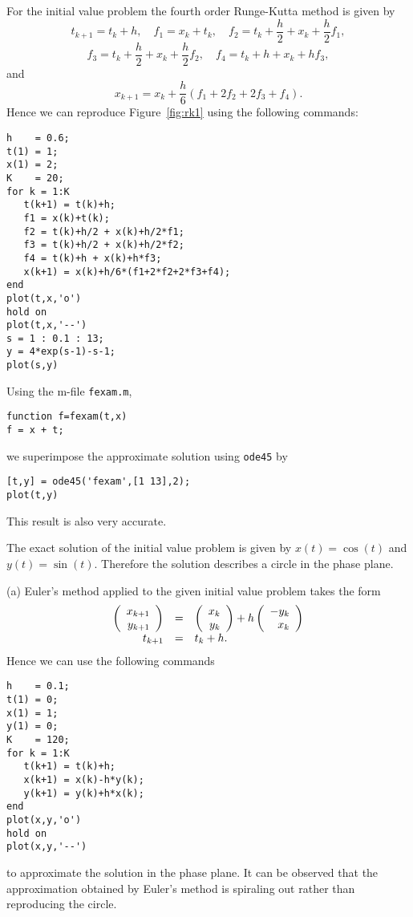  For the initial value problem  the
fourth order Runge-Kutta method is given by
\[
t_{k+1} = t_k+h,\quad f_1= x_k + t_k,\quad
f_2 = t_k+\frac{h}{2} + x_k + \frac{h}{2}f_1,
\]
\[
f_3 = t_k+\frac{h}{2} + x_k + \frac{h}{2}f_2,\quad f_4 = t_k+h+x_k+hf_3,
\]
and
\[
x_{k+1} = x_k + \frac{h}{6}(f_1+2f_2+2f_3+f_4).
\]
Hence we can reproduce Figure~\ref{fig:rk1} using the following
\Matlab commands:
\begin{verbatim}
h    = 0.6;
t(1) = 1;
x(1) = 2;
K    = 20;
for k = 1:K
   t(k+1) = t(k)+h;
   f1 = x(k)+t(k);
   f2 = t(k)+h/2 + x(k)+h/2*f1;
   f3 = t(k)+h/2 + x(k)+h/2*f2;
   f4 = t(k)+h + x(k)+h*f3;
   x(k+1) = x(k)+h/6*(f1+2*f2+2*f3+f4);
end
plot(t,x,'o')
hold on
plot(t,x,'--')
s = 1 : 0.1 : 13;
y = 4*exp(s-1)-s-1;
plot(s,y)
\end{verbatim}
Using the m-file {\tt fexam.m},
\begin{verbatim}
function f=fexam(t,x)
f = x + t;
\end{verbatim}
we superimpose the approximate solution using {\tt ode45} by
\begin{verbatim}
[t,y] = ode45('fexam',[1 13],2);
plot(t,y)
\end{verbatim}
This result is also very accurate.

 The exact solution of the initial value problem
is given by $x(t) = \cos(t)$ and $y(t)=\sin(t)$.  Therefore the
solution describes a circle in the phase plane.

(a) Euler's method applied to the given initial value problem
takes the form
\[
\begin{array}{rcl}
\left(\begin{array}{r} x_{k+1} \\ y_{k+1}\end{array}\right) & = &
\left(\begin{array}{r} x_k \\ y_k\end{array}\right) + h \left(\begin{array}{r} -y_k \\ x_k\end{array}\right)\\
t_{k+1} & = & t_k + h.
\end{array}
\]
Hence we can use the following \Matlab commands
\begin{verbatim}
h    = 0.1;
t(1) = 0;
x(1) = 1;
y(1) = 0;
K    = 120;
for k = 1:K
   t(k+1) = t(k)+h;
   x(k+1) = x(k)-h*y(k);
   y(k+1) = y(k)+h*x(k);
end
plot(x,y,'o')
hold on
plot(x,y,'--')
\end{verbatim}
to approximate the solution in the phase plane.  It can be observed
that the approximation obtained by Euler's method is spiraling out
rather than reproducing the circle.

